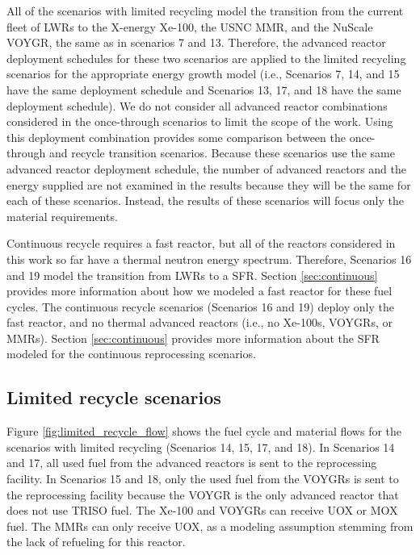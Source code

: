 All of the scenarios with limited recycling model the transition from the 
current fleet of \glspl{LWR} to the X-energy Xe-100, the \gls{USNC} \gls{MMR}, 
and the NuScale VOYGR, the same as in scenarios 7 and 13. Therefore, 
the advanced reactor deployment schedules for these two scenarios are applied 
to the limited recycling scenarios for the appropriate energy growth model
(i.e., Scenarios 7, 14, and 15 have the same deployment schedule and 
Scenarios 13, 17, and 18 have the same deployment schedule). 
We do not consider all advanced reactor 
combinations considered in the once-through scenarios to limit the scope 
of the work. Using this deployment combination provides some comparison between the 
once-through and recycle transition scenarios. Because these scenarios 
use the same advanced reactor deployment schedule, the number of 
advanced reactors and the energy supplied are not examined in the 
results because they will be the same for each of these scenarios. Instead, 
the results of these scenarios will focus only the material requirements. 

Continuous recycle 
requires a fast reactor, but all of the reactors considered in this 
work so far have a thermal neutron energy spectrum. Therefore, 
Scenarios 16 and 19 model the transition from \glspl{LWR} 
to a \gls{SFR}. Section 
\ref{sec:continuous} provides more information about how we 
modeled a fast reactor for these fuel cycles. The continuous recycle 
scenarios (Scenarios 16 and 19) deploy only the fast reactor, and no 
thermal advanced reactors (i.e., no Xe-100s, VOYGRs, or \glspl{MMR}).
Section \ref{sec:continuous} provides more information about the 
\gls{SFR} modeled for the continuous reprocessing scenarios. 

\subsection{Limited recycle scenarios}
Figure \ref{fig:limited_recycle_flow} shows the fuel cycle and material flows 
for the scenarios with limited recycling (Scenarios 14, 15, 17, and 18). 
In Scenarios 14 and 17, all used fuel from the advanced reactors is sent 
to the reprocessing facility.
In Scenarios 15 and 18, only the used fuel from the 
VOYGRs is sent to the reprocessing facility because the VOYGR is 
the only advanced reactor that does not use \gls{TRISO} fuel.
The Xe-100 and VOYGRs can receive 
\gls{UOX} or \gls{MOX} fuel. The \glspl{MMR} can only receive 
\gls{UOX}, as a modeling assumption stemming from the lack of 
refueling for this reactor.

